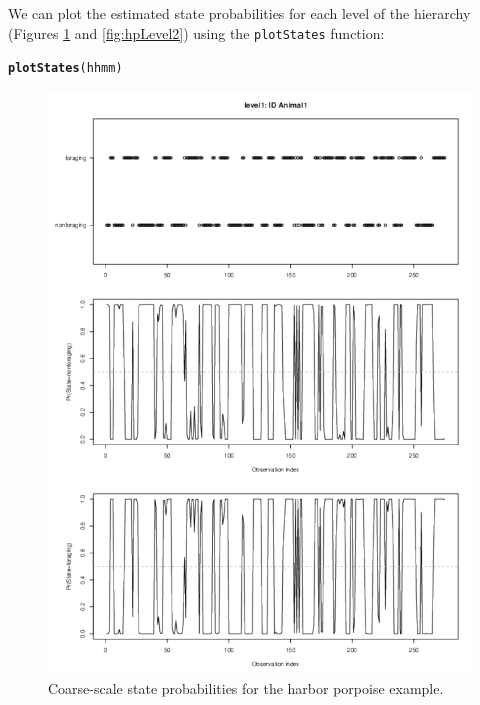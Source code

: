 \documentclass[12pt]{article}\usepackage[]{graphicx}\usepackage[]{xcolor}
\makeatletter
\newcommand{\hldef}[1]{\textcolor[rgb]{0.345,0.345,0.345}{#1}}%
\newcommand{\hlkwd}[1]{\textcolor[rgb]{0.737,0.353,0.396}{\textbf{#1}}}%
\newenvironment{kframe}{%
 \def\at@end@of@kframe{}%
 \ifinner\ifhmode%
  \def\at@end@of@kframe{\end{minipage}}%
  \begin{minipage}{\columnwidth}%
 \fi\fi%
 \def\FrameCommand##1{\hskip\@totalleftmargin \hskip-\fboxsep
 \colorbox{shadecolor}{##1}\hskip-\fboxsep
     \hskip-\linewidth \hskip-\@totalleftmargin \hskip\columnwidth}%
 \MakeFramed {\advance\hsize-\width
   \@totalleftmargin\z@ \linewidth\hsize
   \@setminipage}}%
 {\par\unskip\endMakeFramed%
 \at@end@of@kframe}
\newenvironment{knitrout}{}{} %
\makeatother
\begin{document}
We can plot the estimated state probabilities for each level of the hierarchy (Figures \ref{fig:hpLevel1} and \ref{fig:hpLevel2}) using the \verb|plotStates| function:
\begin{knitrout}
\color{fgcolor}\begin{kframe}
\begin{alltt}
\hlkwd{plotStates}\hldef{(hhmm)}
\end{alltt}
\end{kframe}
\end{knitrout}
\begin{figure}[htbp]
  \centering
  \includegraphics[width=\textwidth]{plot_harborPorpoiseStates001.pdf}
  \caption{Coarse-scale state probabilities for the harbor porpoise example.}
  \label{fig:hpLevel1}
\end{figure}
\end{document}
